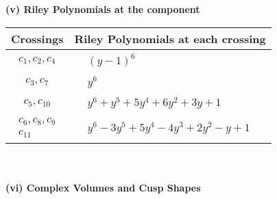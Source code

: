 \documentclass[1p]{elsarticle_modified}
\theoremstyle{definition}
\begin{document}
\newpage\renewcommand{\arraystretch}{1}
\flushleft \textbf{(v) Riley Polynomials at the component}\newline \\
\begin{tabular}{m{50pt}|m{274pt}}
Crossings & \hspace{64pt}Riley Polynomials at each crossing \\
\hline $$\begin{aligned}c_{1},c_{2},c_{4}\end{aligned}$$&$\begin{aligned}
&(y-1)^6
\end{aligned}$\\
\hline $$\begin{aligned}c_{3},c_{7}\end{aligned}$$&$\begin{aligned}
&y^6
\end{aligned}$\\
\hline $$\begin{aligned}c_{5},c_{10}\end{aligned}$$&$\begin{aligned}
&y^6+y^5+5 y^4+6 y^2+3 y+1
\end{aligned}$\\
\hline $$\begin{aligned}c_{6},c_{8},c_{9}\\c_{11}\end{aligned}$$&$\begin{aligned}
&y^6-3 y^5+5 y^4-4 y^3+2 y^2- y+1
\end{aligned}$\\
\hline
\end{tabular}\\~\\
\newpage\flushleft \textbf{(vi) Complex Volumes and Cusp Shapes}
\end{document}
